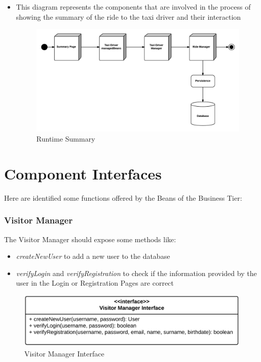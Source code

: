 \begin{itemize}
	\item This diagram represents the components that are involved in the process of showing the summary of the ride to the taxi driver and their interaction
	\begin{figure}[htbp]
	\centering
	\includegraphics[width=\textwidth]{cpt/img/RuntimeSummaryView}
	\caption{Runtime Summary}
	\end{figure}
	\clearpage

\end{itemize}

\section{Component Interfaces}
Here are identified some functions offered by the Beans of the Business Tier:

\subsubsection{Visitor Manager}
The Visitor Manager should expose some methods like:
\begin{itemize}
	\item \textit{createNewUser} to add a new user to the database 
	\item \textit{verifyLogin} and \textit{verifyRegistration} to check if the information provided by the user in the Login or Registration Pages are correct
\end{itemize}

\begin{figure}[htbp]
\centering
\includegraphics[width=\textwidth]{cpt/img/ComponentInterfacesVisitorManagerInterface}
\caption{Visitor Manager Interface}
\end{figure}
\clearpage

